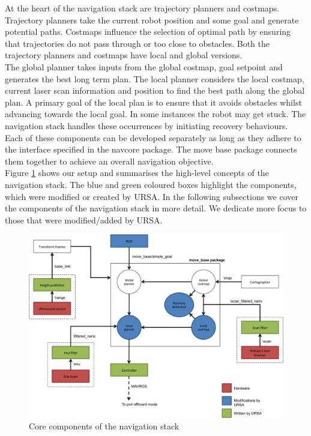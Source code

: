 \documentclass[capstone_report.tex]{subfiles}
\begin{document}
At the heart of the navigation stack are trajectory planners and costmaps.  Trajectory planners take the current robot position and some goal and generate potential paths. Costmaps influence the selection of optimal path by ensuring that trajectories do not pass through or too close to obstacles.  Both the trajectory planners and costmaps have local and global versions.\\

The global planner takes inputs from the global costmap, goal setpoint and generates the best long term plan.  The local planner considers the local costmap, current laser scan information and position to find the best path along the global plan.  A primary goal of the local plan is to ensure that it avoids obstacles whilst advancing towards the local goal.  In some instances the robot may get stuck.  The navigation stack handles these occurrences by initiating recovery behaviours.\\

Each of these components can be developed separately as long as they adhere to the interface specified in the navcore package.  The move base package connects them together to achieve an overall navigation objective.\\

Figure \ref{fig:nav_stack} shows our setup and summarises the high-level concepts of the navigation stack.  The blue and green coloured boxes highlight the components, which were modified or created by URSA.  In the following subsections we cover the components of the navigation stack in more detail.  We dedicate more focus to those that were modified/added by URSA.

\begin{figure}[H]
    \centering
    \includegraphics[width=1\textwidth]{imgs/navigation_stack.png}
    \caption{Core components of the navigation stack\label{fig:nav_stack}}
\end{figure}
\end{document}

